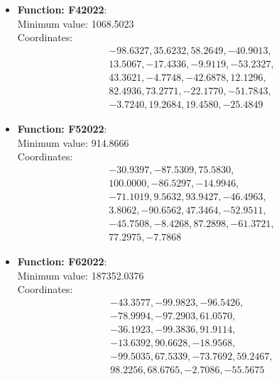 \documentclass{article}
\begin{document}
\begin{itemize}
    \item \textbf{Function: F42022}: \\
      Minimum value: 1068.5023 \\
      Coordinates:
      \[
        \begin{aligned}
          & -98.6327, 35.6232, 58.2649, -40.9013, \\
          & 13.5067, -17.4336, -9.9119, -53.2327, \\
          & 43.3621, -4.7748, -42.6878, 12.1296, \\
          & 82.4936, 73.2771, -22.1770, -51.7843, \\
          & -3.7240, 19.2684, 19.4580, -25.4849
        \end{aligned}
      \]

    \item \textbf{Function: F52022}: \\
      Minimum value: 914.8666 \\
      Coordinates:
      \[
        \begin{aligned}
          & -30.9397, -87.5309, 75.5830, \\
          & 100.0000, -86.5297, -14.9946, \\
          & -71.1019, 9.5632, 93.9427, -46.4963, \\
          & 3.8062, -90.6562, 47.3464, -52.9511, \\
          & -45.7508, -8.4268, 87.2898, -61.3721, \\
          & 77.2975, -7.7868
        \end{aligned}
      \]

    \item \textbf{Function: F62022}: \\
      Minimum value: 187352.0376 \\
      Coordinates:
      \[
        \begin{aligned}
          & -43.3577, -99.9823, -96.5426, \\
          & -78.9994, -97.2903, 61.0570, \\
          & -36.1923, -99.3836, 91.9114, \\
          & -13.6392, 90.6628, -18.9568, \\
          & -99.5035, 67.5339, -73.7692, 59.2467, \\
          & 98.2256, 68.6765, -2.7086, -55.5675
        \end{aligned}
      \]


\end{itemize}
\end{document}
